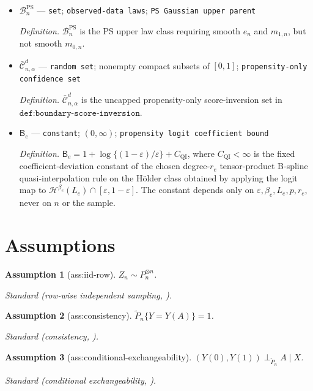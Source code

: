 \documentclass{article}
\newtheorem{assumption}{Assumption}
\begin{document}
\begin{itemize}
  \item \(\mathcal B_n^{\mathrm{PS}}\) --- \texttt{set}; \texttt{observed-\allowbreak{}data laws}; \texttt{PS Gaussian upper parent}
  \par\smallskip\noindent\emph{Definition.} \(\mathcal B_n^{\mathrm{PS}}\) is the PS upper law class requiring smooth \(e_n\) and \(m_{1,n}\), but not smooth \(m_{0,n}\).
  \item \(\bar{\mathcal C}_{n,\alpha}^d\) --- \texttt{random set}; nonempty compact subsets of \([0,1]\); \texttt{propensity-\allowbreak{}only confidence set}
  \par\smallskip\noindent\emph{Definition.} \(\bar{\mathcal C}_{n,\alpha}^d\) is the uncapped propensity-only score-inversion set in \(\texttt{def:boundary-score-inversion}\).
  \item \(\mathsf B_e\) --- \texttt{constant}; \((0,\infty)\); \texttt{propensity logit coefficient bound}
  \par\smallskip\noindent\emph{Definition.} \(\mathsf B_e=1+\log\{(1-\varepsilon)/\varepsilon\}+C_{\mathrm{QI}}\), where \(C_{\mathrm{QI}}<\infty\) is the fixed coefficient-deviation constant of the chosen degree-\(r_e\) tensor-product B-spline quasi-interpolation rule on the H\"older class obtained by applying the logit map to \(\mathcal H^{\beta_e}(L_e)\cap[\varepsilon,1-\varepsilon]\). The constant depends only on \(\varepsilon,\beta_e,L_e,p,r_e\), never on \(n\) or the sample.
\end{itemize}

\section{Assumptions}

\begin{assumption}[ass:iid-row]\label{ass:iid-row}
\(Z_n\sim P_n^{\otimes n}\).
\par\smallskip\noindent\emph{Standard} (row-wise independent sampling, \cite{ChernozhukovEtAl2018DML}).
\end{assumption}

\begin{assumption}[ass:consistency]\label{ass:consistency}
\(\widetilde P_n\{Y=Y(A)\}=1\).
\par\smallskip\noindent\emph{Standard} (consistency, \cite{TianPearl2000}).
\end{assumption}

\begin{assumption}[ass:conditional-exchangeability]\label{ass:conditional-exchangeability}
\((Y(0),Y(1))\perp_{\widetilde P_n}A\mid X\).
\par\smallskip\noindent\emph{Standard} (conditional exchangeability, \cite{TianWu2025}).
\end{assumption}
\end{document}

